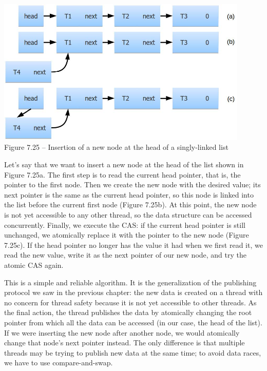 \hspace*{\fill} \\ %
\begin{center}
\includegraphics[width=0.9\textwidth]{content/2/chapter7/images/25.jpg}\\
Figure 7.25 – Insertion of a new node at the head of a singly-linked list
\end{center}

Let's say that we want to insert a new node at the head of the list shown in Figure 7.25a. The first step is to read the current head pointer, that is, the pointer to the first node. Then we create the new node with the desired value; its next pointer is the same as the current head pointer, so this node is linked into the list before the current first node (Figure 7.25b). At this point, the new node is not yet accessible to any other thread, so the data structure can be accessed concurrently. Finally, we execute the CAS: if the current head pointer is still unchanged, we atomically replace it with the pointer to the new node (Figure 7.25c). If the head pointer no longer has the value it had when we first read it, we read the new value, write it as the next pointer of our new node, and try the atomic CAS  again.

This is a simple and reliable algorithm. It is the generalization of the publishing protocol we saw in the previous chapter: the new data is created on a thread with no concern for thread safety because it is not yet accessible to other threads. As the final action, the thread publishes the data by atomically changing the root pointer from which all the data can be accessed (in our case, the head of the list). If we were inserting the new node after another node, we would atomically change that node's next pointer instead. The only difference is that multiple threads may be trying to publish new data at the same time; to avoid data races, we have to use compare-and-swap. 

